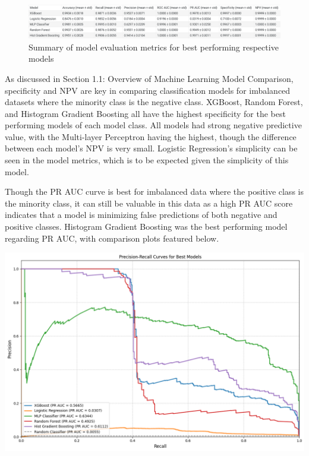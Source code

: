 \documentclass{article}
\begin{document}
\begin{figure}[t]
    \centering
    \includegraphics[scale = .4]{images/summary chart.pdf}
    \caption{Summary of model evaluation metrics for best performing respective models}
\end{figure}

As discussed in Section 1.1: Overview of Machine Learning Model Comparison, specificity and NPV are key in comparing classification models for imbalanced datasets where the minority class is the negative class. XGBoost, Random Forest, and Histogram Gradient Boosting all have the highest specificity for the best performing models of each model class. All models had strong negative predictive value, with the Multi-layer Perceptron having the highest, though the difference between each model's NPV is very small. Logistic Regression's simplicity can be seen in the model metrics, which is to be expected given the simplicity of this model.

Though the PR AUC curve is best for imbalanced data where the positive class is the minority class, it can still be valuable in this data as a high PR AUC score indicates that a model is minimizing false predictions of both negative and positive classes. Histogram Gradient Boosting was the best performing model regarding PR AUC, with comparison plots featured below. 

\begin{center}
    \includegraphics[scale = .25]{images/PR curves.png}
\end{center}
\end{document}
